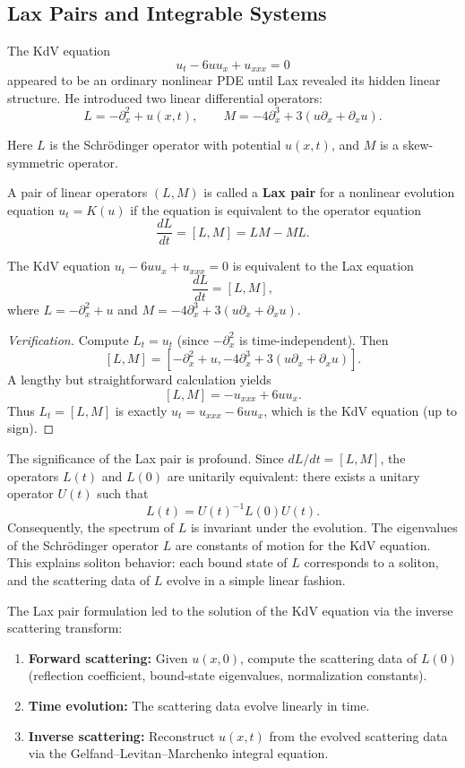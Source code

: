 \subsection{Lax Pairs and Integrable Systems}

The KdV equation
\[
u_t - 6uu_x + u_{xxx} = 0
\]
appeared to be an ordinary nonlinear PDE until Lax revealed its hidden linear structure. He introduced two linear differential operators:
\[
L = -\partial_x^2 + u(x,t), \qquad
M = -4\partial_x^3 + 3(u \partial_x + \partial_x u).
\]

Here \(L\) is the Schr\"odinger operator with potential \(u(x,t)\), and \(M\) is a skew-symmetric operator.

\begin{definition}
A pair of linear operators \((L, M)\) is called a \textbf{Lax pair} for a nonlinear evolution equation \(u_t = K(u)\) if the equation is equivalent to the operator equation
\[
\frac{dL}{dt} = [L, M] = LM - ML.
\]
\end{definition}

\begin{theorem}[Lax, 1968]
The KdV equation \(u_t - 6uu_x + u_{xxx} = 0\) is equivalent to the Lax equation
\[
\frac{dL}{dt} = [L, M],
\]
where \(L = -\partial_x^2 + u\) and \(M = -4\partial_x^3 + 3(u \partial_x + \partial_x u)\).
\end{theorem}

\begin{proof}[Verification]
Compute \(L_t = u_t\) (since \(-\partial_x^2\) is time-independent). Then
\[
[L, M] = [-\partial_x^2 + u, -4\partial_x^3 + 3(u\partial_x + \partial_x u)].
\]
A lengthy but straightforward calculation yields
\[
[L, M] = -u_{xxx} + 6uu_x.
\]
Thus \(L_t = [L, M]\) is exactly \(u_t = u_{xxx} - 6uu_x\), which is the KdV equation (up to sign).
\end{proof}

The significance of the Lax pair is profound. Since \(dL/dt = [L, M]\), the operators \(L(t)\) and \(L(0)\) are unitarily equivalent: there exists a unitary operator \(U(t)\) such that
\[
L(t) = U(t)^{-1} L(0) U(t).
\]
Consequently, the spectrum of \(L\) is invariant under the evolution. The eigenvalues of the Schr\"odinger operator \(L\) are constants of motion for the KdV equation. This explains soliton behavior: each bound state of \(L\) corresponds to a soliton, and the scattering data of \(L\) evolve in a simple linear fashion.

The Lax pair formulation led to the solution of the KdV equation via the inverse scattering transform:
\begin{enumerate}
    \item \textbf{Forward scattering:} Given \(u(x,0)\), compute the scattering data of \(L(0)\) (reflection coefficient, bound-state eigenvalues, normalization constants).
    \item \textbf{Time evolution:} The scattering data evolve linearly in time.
    \item \textbf{Inverse scattering:} Reconstruct \(u(x,t)\) from the evolved scattering data via the Gelfand--Levitan--Marchenko integral equation.
\end{enumerate}

